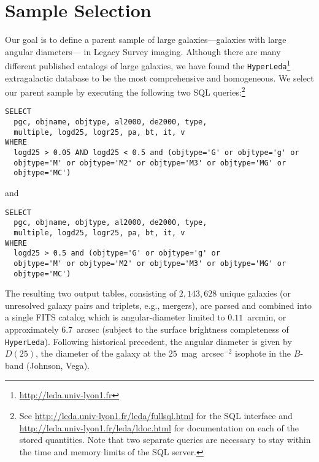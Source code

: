 \section{Sample Selection}\label{sec:sample}

Our goal is to define a parent sample of large galaxies---galaxies with large
angular diameters--- in Legacy Survey imaging.
Although there are many different published catalogs of large galaxies, we have
found the {\tt HyperLeda}\footnote{\url{http://leda.univ-lyon1.fr}}
extragalactic database to be the most comprehensive and homogeneous.  We select
our parent sample by executing the following two SQL queries:\footnote{See
  \url{http://leda.univ-lyon1.fr/leda/fullsql.html} for the SQL interface and
  \url{http://leda.univ-lyon1.fr/leda/ldoc.html} for documentation on each of
  the stored quantities.  Note that two separate queries are necessary to stay
  within the time and memory limits of the SQL server.  }

\begin{verbatim}
SELECT
  pgc, objname, objtype, al2000, de2000, type, 
  multiple, logd25, logr25, pa, bt, it, v
WHERE 
  logd25 > 0.05 AND logd25 < 0.5 and (objtype='G' or objtype='g' or 
  objtype='M' or objtype='M2' or objtype='M3' or objtype='MG' or 
  objtype='MC')
\end{verbatim}

\noindent and

\begin{verbatim}
SELECT
  pgc, objname, objtype, al2000, de2000, type, 
  multiple, logd25, logr25, pa, bt, it, v
WHERE 
  logd25 > 0.5 and (objtype='G' or objtype='g' or 
  objtype='M' or objtype='M2' or objtype='M3' or objtype='MG' or 
  objtype='MC')
\end{verbatim}


\noindent The resulting two output tables, consisting of $2,143,628$ unique
galaxies (or unresolved galaxy pairs and triplets, e.g., mergers), are parsed
and combined into a single FITS catalog which is angular-diameter limited to
$0.11$~arcmin, or approximately $6.7$~arcsec (subject to the surface brightness
completeness of {\tt HyperLeda}).  Following historical precedent, the angular
diameter is given by $D(25)$, the diameter of the galaxy at the
$25$~mag~arcsec$^{-2}$ isophote in the $B$-band (Johnson, Vega).

